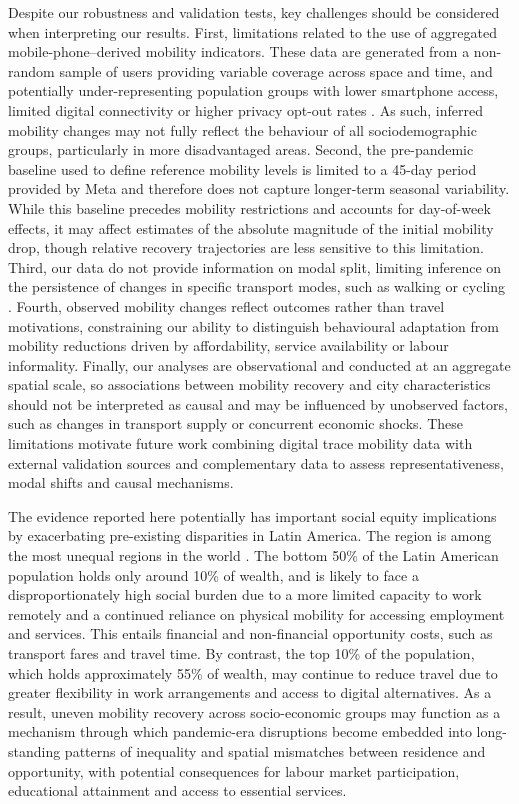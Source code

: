 \documentclass[fleqn,10pt]{wlscirep}
\begin{document}
Despite our robustness and validation tests, key challenges should be considered when interpreting our results. First, limitations related to the use of aggregated mobile-phone–derived mobility indicators. These data are generated from a non-random sample of users providing variable coverage across space and time, and potentially under-representing population groups with lower smartphone access, limited digital connectivity or higher privacy opt-out rates \cite{cabrera2025bias}. As such, inferred mobility changes may not fully reflect the behaviour of all sociodemographic groups, particularly in more disadvantaged areas. Second, the pre-pandemic baseline used to define reference mobility levels is limited to a 45-day period provided by Meta and therefore does not capture longer-term seasonal variability. While this baseline precedes mobility restrictions and accounts for day-of-week effects, it may affect estimates of the absolute magnitude of the initial mobility drop, though relative recovery trajectories are less sensitive to this limitation. Third, our data do not provide information on modal split, limiting inference on the persistence of changes in specific transport modes, such as walking or cycling \cite{zhang2023impacts}. Fourth, observed mobility changes reflect outcomes rather than travel motivations, constraining our ability to distinguish behavioural adaptation from mobility reductions driven by affordability, service availability or labour informality. Finally, our analyses are observational and conducted at an aggregate spatial scale, so associations between mobility recovery and city characteristics should not be interpreted as causal and may be influenced by unobserved factors, such as changes in transport supply or concurrent economic shocks. These limitations motivate future work combining digital trace mobility data with external validation sources and complementary data to assess representativeness, modal shifts and causal mechanisms.

The evidence reported here potentially has important social equity implications by exacerbating pre-existing disparities in Latin America. The region is among the most unequal regions in the world \cite{WIReport22}. The bottom 50\% of the Latin American population holds only around 10\% of wealth\cite{WIReport22}, and is likely to face a disproportionately high social burden due to a more limited capacity to work remotely and a continued reliance on physical mobility for accessing employment and services. This entails financial and non-financial opportunity costs, such as transport fares and travel time. By contrast, the top 10\% of the population, which holds approximately 55\% of wealth\cite{WIReport22}, may continue to reduce travel due to greater flexibility in work arrangements and access to digital alternatives. As a result, uneven mobility recovery across socio-economic groups may function as a mechanism through which pandemic-era disruptions become embedded into long-standing patterns of inequality and spatial mismatches between residence and opportunity, with potential consequences for labour market participation, educational attainment and access to essential services. 
\end{document}
